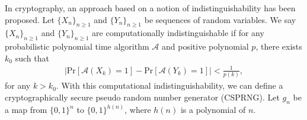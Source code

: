 %
\par
In cryptography, an approach based on a notion of indistinguishability has been proposed. 
Let $\{X_n\}_{n\geq 1}$ and $\{Y_n\}_{n\geq 1}$ be sequences of random variables. 
%
We say $\{X_n\}_{n\geq 1}$ and $\{Y_n\}_{n\geq 1}$ are computationally indistinguishable if for any probabilistic polynomial time algorithm $\mathcal{A}$ and positive polynomial $p$, there exists $k_0$ such that 
\begin{align}\label{eq:indistinguishable}
	\bigl| \mathrm{Pr}[\mathcal{A}(X_k) = 1] - \mathrm{Pr}[\mathcal{A}(Y_k) = 1] \bigr| < \frac{1}{p(k)},
\end{align}
 for any $k>k_0$.
%
With this computational indistinguishability, we can define a cryptographically secure pseudo random number generator (CSPRNG). 
%
Let $g_n$ be a map from $\{0,1\}^n$ to $\{0,1\}^{h(n)}$, where $h(n)$ is a polynomial of $n$.

